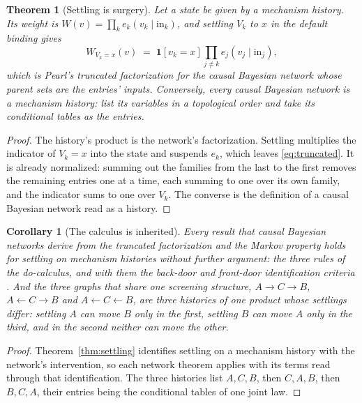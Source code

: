 \documentclass[11pt]{article}
\newtheorem{theorem}{Theorem}
\newtheorem{corollary}{Corollary}
\begin{document}
\begin{theorem}[Settling is surgery]\label{thm:surgery}
\label{thm:settling}
Let a state be given by a mechanism history. Its weight is $W(v) = \prod_k e_k(v_k \mid \mathrm{in}_k)$, and settling $V_k$ to $x$ in the default binding gives
\begin{equation}
\label{eq:truncated}
W_{V_k = x}(v) \;=\; \mathbf{1}[v_k = x] \prod_{j \ne k} e_j(v_j \mid \mathrm{in}_j),
\end{equation}
which is Pearl's truncated factorization for the causal Bayesian network whose parent sets are the entries' inputs. Conversely, every causal Bayesian network is a mechanism history: list its variables in a topological order and take its conditional tables as the entries.
\end{theorem}
\begin{proof}
The history's product is the network's factorization. Settling multiplies the indicator of $V_k = x$ into the state and suspends $e_k$, which leaves \eqref{eq:truncated}. It is already normalized: summing out the families from the last to the first removes the remaining entries one at a time, each summing to one over its own family, and the indicator sums to one over $V_k$. The converse is the definition of a causal Bayesian network read as a history.
\end{proof}

\begin{corollary}[The calculus is inherited]
\label{cor:inherited}
Every result that causal Bayesian networks derive from the truncated factorization and the Markov property holds for settling on mechanism histories without further argument: the three rules of the do-calculus, and with them the back-door and front-door identification criteria \cite{pearl2009causality}. And the three graphs that share one screening structure, $A \to C \to B$, $A \leftarrow C \to B$ and $A \leftarrow C \leftarrow B$, are three histories of one product whose settlings differ: settling $A$ can move $B$ only in the first, settling $B$ can move $A$ only in the third, and in the second neither can move the other.
\end{corollary}
\begin{proof}
Theorem~\ref{thm:settling} identifies settling on a mechanism history with the network's intervention, so each network theorem applies with its terms read through that identification. The three histories list $A, C, B$, then $C, A, B$, then $B, C, A$, their entries being the conditional tables of one joint law.
\end{proof}
\end{document}
